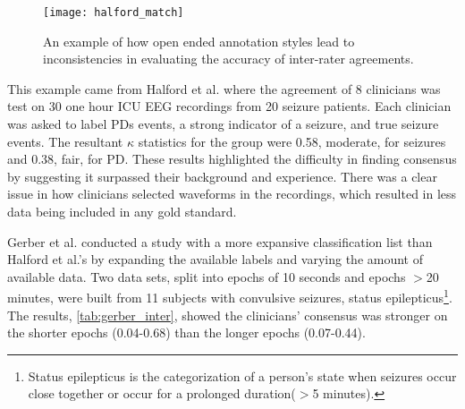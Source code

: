 \begin{figure}[ht]
\centering
\texttt{[image: halford\_match]}
\caption[Inter-rater annotation matching]{An example of how open ended annotation styles lead to inconsistencies in evaluating the accuracy of inter-rater agreements.}
\label{fig:halford_match}
\end{figure}

This example came from Halford et al.\cite{Halford2015} where the agreement of 8 clinicians was test on 30 one hour \ac{ICU} \ac{EEG} recordings from 20 seizure patients. Each clinician was asked to label \acp{PD} events, a strong indicator of a seizure, and true seizure events. The resultant $\kappa$ statistics for the group were 0.58, moderate, for seizures and 0.38, fair, for \ac{PD}. These results highlighted the difficulty in finding consensus by suggesting it surpassed their background and experience. There was a clear issue in how clinicians selected waveforms in the recordings, which resulted in less data being included in any gold standard.

Gerber et al.\cite{Gerber2008} conducted a study with a more expansive classification list than Halford et al.'s by expanding the available labels and varying the amount of available data. Two data sets, split into epochs of 10 seconds and epochs $>$20 minutes, were built from 11 subjects with convulsive seizures, status epilepticus\footnote{Status epilepticus is the categorization of a person's state when seizures occur close together or occur for a prolonged duration($>$5 minutes).}. The results, \cref{tab:gerber_inter}, showed the clinicians' consensus was stronger on the shorter epochs (0.04-0.68) than the longer epochs (0.07-0.44).

